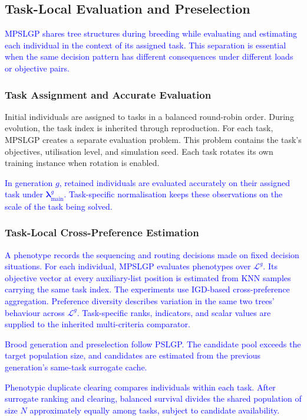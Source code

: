 \documentclass[10pt,journal]{IEEEtran}
\newcommand{\revision}[1]{\textcolor{blue}{#1}}
\begin{document}
\subsection{Task-Local Evaluation and Preselection}
\revision{MPSLGP shares tree structures during breeding while evaluating and estimating each individual in the context of its assigned task. This separation is essential when the same decision pattern has different consequences under different loads or objective pairs.}

\subsubsection{Task Assignment and Accurate Evaluation}
Initial individuals are assigned to tasks in a balanced round-robin order. During evolution, the task index is inherited through reproduction. For each task, MPSLGP creates a separate evaluation problem. This problem contains the task's objectives, utilisation level, and simulation seed. Each task rotates its own training instance when rotation is enabled.

\revision{In generation $g$, retained individuals are evaluated accurately on their assigned task under $\boldsymbol{\lambda}_{\mathrm{main}}^g$. Task-specific normalisation keeps these observations on the scale of the task being solved.}

\subsubsection{Task-Local Cross-Preference Estimation}
\revision{A phenotype records the sequencing and routing decisions made on fixed decision situations. For each individual, MPSLGP evaluates phenotypes over $\mathcal{L}^g$. Its objective vector at every auxiliary-list position is estimated from KNN samples carrying the same task index. The experiments use IGD-based cross-preference aggregation. Preference diversity describes variation in the same two trees' behaviour across $\mathcal{L}^g$. Task-specific ranks, indicators, and scalar values are supplied to the inherited multi-criteria comparator.}

\revision{Brood generation and preselection follow PSLGP. The candidate pool exceeds the target population size, and candidates are estimated from the previous generation's same-task surrogate cache.}

\revision{Phenotypic duplicate clearing compares individuals within each task. After surrogate ranking and clearing, balanced survival divides the shared population of size $N$ approximately equally among tasks, subject to candidate availability.}
\end{document}
